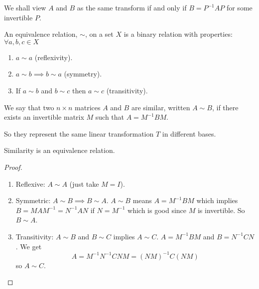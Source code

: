 \documentclass[10pt, a4paper]{article}
\begin{document}
We shall view $A$ and $B$ as the same transform if and only if $B = P ^ {-1}AP$ for some invertible $P$.

\begin{definition}
    An equivalence relation,
    $\sim$,
    on a set $X$ is a binary relation with properties:
    $\forall a, b, c \in X$
    \begin{enumerate}[label = (\roman*)]
        \item $a \sim a$
        (reflexivity).

        \item $a \sim b \implies b \sim a$
        (symmetry).

        \item If $a \sim b$ and $b \sim c$ then $a \sim c$
        (transitivity).
    \end{enumerate}
\end{definition}

\begin{definition}
    We say that two $n \times n$ matrices $A$ and $B$ are similar,
    written $A \sim B$,
    if there exists an invertible matrix $M$ such that $A = M ^ {-1}BM$.
\end{definition}
So they represent the same linear transformation $T$ in different bases.

\begin{proposition}
    Similarity is an equivalence relation.
    \begin{proof}
        \begin{enumerate}[label = (\roman*)]
            \item Reflexive:
            $A \sim A$
            (just take $M = I$).

            \item Symmetric:
            $A \sim B \implies B \sim A$.
            $A \sim B$ means $A = M ^ {-1}BM$ which implies $B = MAM ^ {-1} = N ^ {-1}AN$ if $N = M ^ {-1}$ which is good since $M$ is invertible.
            So $B \sim A$.

            \item Transitivity:
            $A \sim B$ and $B \sim C$ implies $A \sim C$.
            $A = M ^ {-1}BM$
            and
            $B = N ^ {-1}CN$.
            We get
            \[
            A = M ^{-1}N ^ {-1}CNM = (NM) ^ {-1}C(NM)
            \]
            so $A \sim C$.
        \end{enumerate}
    \end{proof}
\end{proposition}
\end{document}
